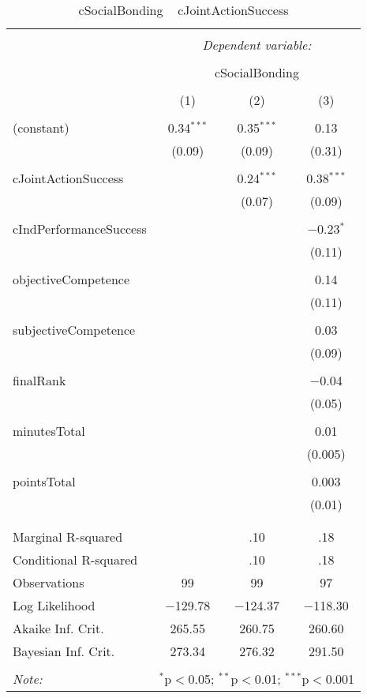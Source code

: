 
\begin{table}[!htbp] \centering 
  \caption{cSocialBonding ~ cJointActionSuccess} 
  \label{tab:MLM23acJointActionSuccesscBonding} 
\footnotesize 
\begin{tabular}{@{\extracolsep{5pt}}lccc} 
\\[-1.8ex]\hline 
\hline \\[-1.8ex] 
 & \multicolumn{3}{c}{\textit{Dependent variable:}} \\ 
\cline{2-4} 
\\[-1.8ex] & \multicolumn{3}{c}{cSocialBonding} \\ 
\\[-1.8ex] & (1) & (2) & (3)\\ 
\hline \\[-1.8ex] 
 (constant) & 0.34$^{***}$ & 0.35$^{***}$ & 0.13 \\ 
  & (0.09) & (0.09) & (0.31) \\ 
  & & & \\ 
 cJointActionSuccess &  & 0.24$^{***}$ & 0.38$^{***}$ \\ 
  &  & (0.07) & (0.09) \\ 
  & & & \\ 
 cIndPerformanceSuccess &  &  & $-$0.23$^{*}$ \\ 
  &  &  & (0.11) \\ 
  & & & \\ 
 objectiveCompetence &  &  & 0.14 \\ 
  &  &  & (0.11) \\ 
  & & & \\ 
 subjectiveCompetence &  &  & 0.03 \\ 
  &  &  & (0.09) \\ 
  & & & \\ 
 finalRank &  &  & $-$0.04 \\ 
  &  &  & (0.05) \\ 
  & & & \\ 
 minutesTotal &  &  & 0.01 \\ 
  &  &  & (0.005) \\ 
  & & & \\ 
 pointsTotal &  &  & 0.003 \\ 
  &  &  & (0.01) \\ 
  & & & \\ 
\hline \\[-1.8ex] 
Marginal R-squared &  & .10 & .18 \\ 
Conditional R-squared &  & .10 & .18 \\ 
Observations & 99 & 99 & 97 \\ 
Log Likelihood & $-$129.78 & $-$124.37 & $-$118.30 \\ 
Akaike Inf. Crit. & 265.55 & 260.75 & 260.60 \\ 
Bayesian Inf. Crit. & 273.34 & 276.32 & 291.50 \\ 
\hline 
\hline \\[-1.8ex] 
\textit{Note:}  & \multicolumn{3}{r}{$^{*}$p$<$0.05; $^{**}$p$<$0.01; $^{***}$p$<$0.001} \\ 
\end{tabular} 
\end{table} 

